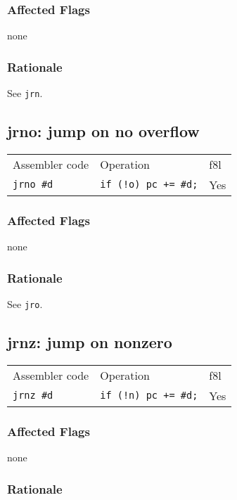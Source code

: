 \documentclass{book}
\begin{document}
\subsubsection*{Affected Flags}

none

\subsubsection*{Rationale}

See \texttt{jrn}.


\subsection{jrno: jump on no overflow}

\begin{tabular}{l l l}
Assembler code    & Operation                   & f8l \\
\texttt{jrno \#d} & \texttt{if (!o) pc += \#d;} & Yes \\
\end{tabular}

\subsubsection*{Affected Flags}

none

\subsubsection*{Rationale}

See \texttt{jro}.


\subsection{jrnz: jump on nonzero}

\begin{tabular}{l l l}
Assembler code    & Operation                   & f8l \\
\texttt{jrnz \#d} & \texttt{if (!n) pc += \#d;} & Yes \\
\end{tabular}

\subsubsection*{Affected Flags}

none

\subsubsection*{Rationale}
\end{document}
